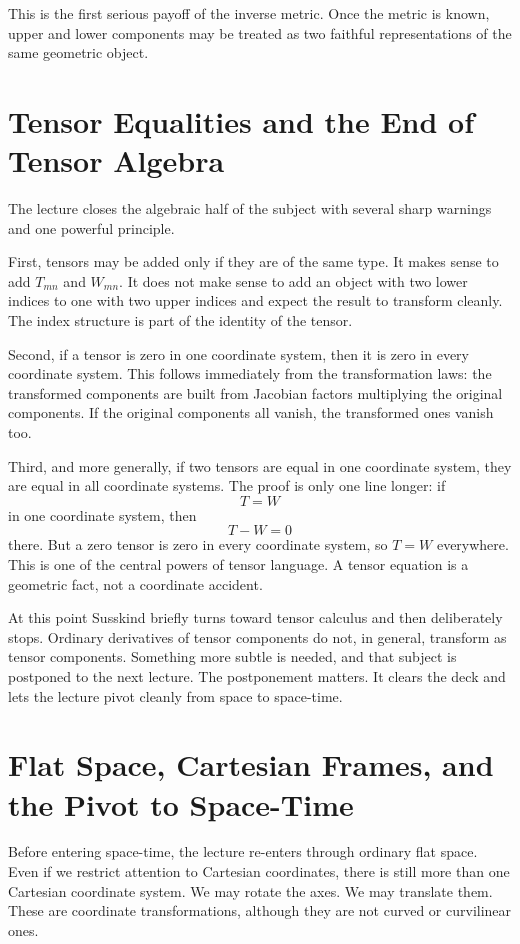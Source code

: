 This is the first serious payoff of the inverse metric. Once the metric is known, upper and lower components may be treated as two faithful representations of the same geometric object.

\section{Tensor Equalities and the End of Tensor Algebra}

The lecture closes the algebraic half of the subject with several sharp warnings and one powerful principle.

First, tensors may be added only if they are of the same type. It makes sense to add \(T_{mn}\) and \(W_{mn}\). It does not make sense to add an object with two lower indices to one with two upper indices and expect the result to transform cleanly. The index structure is part of the identity of the tensor.

Second, if a tensor is zero in one coordinate system, then it is zero in every coordinate system. This follows immediately from the transformation laws: the transformed components are built from Jacobian factors multiplying the original components. If the original components all vanish, the transformed ones vanish too.

Third, and more generally, if two tensors are equal in one coordinate system, they are equal in all coordinate systems. The proof is only one line longer: if
\[
T=W
\]
in one coordinate system, then
\[
T-W=0
\]
there. But a zero tensor is zero in every coordinate system, so \(T=W\) everywhere. This is one of the central powers of tensor language. A tensor equation is a geometric fact, not a coordinate accident.

At this point Susskind briefly turns toward tensor calculus and then deliberately stops. Ordinary derivatives of tensor components do not, in general, transform as tensor components. Something more subtle is needed, and that subject is postponed to the next lecture. The postponement matters. It clears the deck and lets the lecture pivot cleanly from space to space-time.

\section{Flat Space, Cartesian Frames, and the Pivot to Space-Time}

Before entering space-time, the lecture re-enters through ordinary flat space. Even if we restrict attention to Cartesian coordinates, there is still more than one Cartesian coordinate system. We may rotate the axes. We may translate them. These are coordinate transformations, although they are not curved or curvilinear ones.

